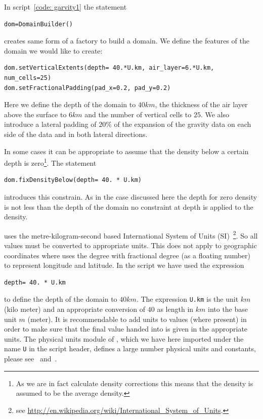 In script~\ref{code: garvity1} the statement
\begin{verbatim}
dom=DomainBuilder()
\end{verbatim}
creates same form of a factory to build a domain. 
We define the features of the domain we would like to create:
\begin{verbatim}
dom.setVerticalExtents(depth= 40.*U.km, air_layer=6.*U.km, num_cells=25)
dom.setFractionalPadding(pad_x=0.2, pad_y=0.2)
\end{verbatim}
Here we define the depth of the domain to $40 km$, the thickness of the air layer above the surface to $6km$ and 
the number of vertical cells to $25$. We also introduce a lateral padding of $20 \%$ of the expansion of
the gravity data on each side of the data and in both lateral directions.

In some cases it can be appropriate to assume that the density below a certain depth is 
zero\footnote{As we are in fact calculate density corrections this means that the density is assumed to be
the average density.}. The statement 
\begin{verbatim}
dom.fixDensityBelow(depth= 40. * U.km)
\end{verbatim}
introduces this constrain. As in the case discussed here the depth for zero density is not less than the
depth of the domain no constraint at depth is applied to the density.

\downunder uses the  metre-kilogram-second based 
International System of Units (SI)~\footnote{see \url{http://en.wikipedia.org/wiki/International_System_of_Units}.}. So all 
values must be converted to appropriate units. This does not apply to geographic coordinates where \downunder uses
the degree with fractional degree (as a floating number) to represent longitude and latitude. In the script we have used the expression
\begin{verbatim}
depth= 40. * U.km
\end{verbatim}
to define the depth of the domain to $40 km$. The expression \verb|U.km| is the unit $km$ (kilo meter) and an appropriate conversion 
of $40$ as length in $km$  into the base unit $m$ (meter). It is recommendable to add units to values (where present) 
in order to make sure that the final value handed into \downunder is given in the appropriate units. The physical units
module of \escript, which we have here imported under the name \verb|U| in the script header, defines a large number 
physical units and constants, please see~\cite{ESCRIPT} and~\cite{ESCRIPTONLINE}. 

